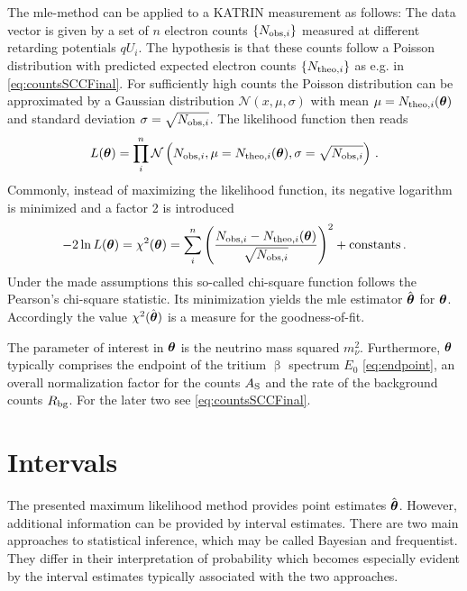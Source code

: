 The \gls{mle}-method can be applied to a KATRIN measurement as follows: The data vector is given by a set of $n$ electron counts $\left\{N_{\mathrm{obs,}i}\right\}$ measured at different retarding potentials $qU_i$. The hypothesis is that these counts follow a Poisson distribution with predicted expected electron counts $\left\{N_{\mathrm{theo,}i}\right\}$ as e.g. in \eqref{eq:countsSCCFinal}. For sufficiently high counts the Poisson distribution can be approximated by a Gaussian distribution $\mathcal{N}(x,\mu, \sigma)$ with mean $\mu=N_{\mathrm{theo,}i}(\boldsymbol{\mathbf{\theta}})$ and standard deviation $\sigma=\sqrt{N_{\mathrm{obs,}i}}$. The likelihood function then reads
\begin{equation}
	\label{eq:KATRINlikelihood}
	L(\boldsymbol{\mathbf{\theta}}) = \prod_{i}^{n} \mathcal{N}\left(N_{\mathrm{obs,}i},\mu=N_{\mathrm{theo,}i}(\boldsymbol{\mathbf{\theta}}), \sigma=\sqrt{N_{\mathrm{obs,}i}}\right)
	\text{\,.}
\end{equation}
Commonly, instead of maximizing the likelihood function, its negative logarithm is minimized and a factor 2 is introduced
\begin{equation}
	\label{eq:katrinChi2}
	-2\ln L(\boldsymbol{\mathbf{\theta}}) = \chi^2(\boldsymbol{\mathbf{\theta}}) = \sum_i^n
		\left( 
			\frac{N_{\mathrm{obs,}i}-N_{\mathrm{theo,}i}(\boldsymbol{\mathbf{\theta}})}{\sqrt{N_{\mathrm{obs,}i}}}
		\right)^2
		 + \mathrm{constants}
		\text{\,.}
\end{equation}
Under the made assumptions this so-called chi-square function follows the Pearson's chi-square statistic. Its minimization yields the \gls{mle} estimator $\hat{\boldsymbol{\mathbf{\theta}}}$ for $\boldsymbol{\mathbf{\theta}}$. Accordingly the value $\chi^2(\hat{\boldsymbol{\mathbf{\theta}}})$ is a measure for the goodness-of-fit.

The parameter of interest in $\boldsymbol{\mathbf{\theta}}$ is the neutrino mass squared $m_\nu^2$. Furthermore, $\boldsymbol{\mathbf{\theta}}$ typically comprises the endpoint of the tritium $\upbeta$ spectrum $E_0$ \eqref{eq:endpoint}, an overall normalization factor for the counts $A_\mathrm{S}$ and the rate of the background counts $R_\mathrm{bg}$. For the later two see \eqref{eq:countsSCCFinal}.

\section{Intervals}
The presented maximum likelihood method provides point estimates $\hat{\boldsymbol{\mathbf{\theta}}}$. However, additional information can be provided by interval estimates. There are two main approaches to statistical inference, which may be called Bayesian and frequentist. They differ in their interpretation of probability which becomes especially evident by the interval estimates typically associated with the two approaches.

